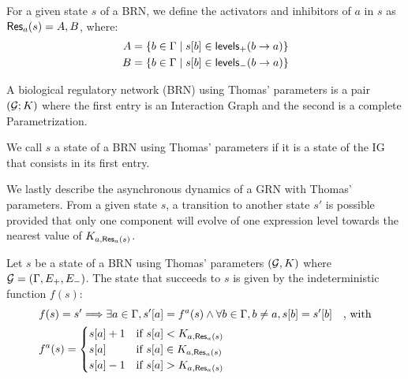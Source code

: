 \begin{definition}\label{def:resources}
For a given state $s$ of a BRN, we define the activators and inhibitors of $a$ in $s$ as $\mathsf{Res}_{a}(s) = A,B$, where:
\begin{align*}
  A &= \{b \in \Gamma \mid {s[b]} \in \mathsf{levels}_+(b\rightarrow a)\} \\
  B &= \{b \in \Gamma \mid {s[b]} \in \mathsf{levels}_-(b\rightarrow a)\}
\end{align*}
\end{definition}

\begin{definition}\label{def:brn}
A biological regulatory network (BRN) using Thomas' parameters is a pair $(\mathcal{G}; K)$ where the first entry is an Interaction Graph and the second is a complete Parametrization.
\end{definition}
We call $s$ a state of a BRN using Thomas' parameters if it is a state of the IG that consists in its first entry.


We lastly describe the asynchronous dynamics of a GRN with Thomas' parameters.
From a given state $s$, a transition to another state $s'$ is possible provided that only one component will evolve of one expression level towards the nearest value of $K_{a,\mathsf{Res}_{a}(s)}$.

\begin{definition}\label{def:dynamics}
Let $s$ be a state of a BRN using Thomas' parameters $(\mathcal{G}, K)$ where $\mathcal{G} = (\Gamma, E_+, E_-)$.
The state that succeeds to $s$ is given by the indeterministic function $f(s)$:
\begin{align*}
  & f(s) = s' \Longrightarrow \exists a \in \Gamma,
    {s'[a]} = f^a(s) \wedge
    \forall b \in \Gamma, b \neq a, {s[b]} = {s'[b]}
    \quad\text{, with}\\
  & f^a(s) =
  \begin{cases}
    {s[a]} + 1 & \text{if } {s[a]} < K_{a, \mathsf{Res}_{a}(s)} \\
    {s[a]} & \text{if } {s[a]} \in K_{a,\mathsf{Res}_{a}(s)}\\
    {s[a]} - 1 & \text{if } {s[a]} > K_{a,\mathsf{Res}_{a}(s)}
  \end{cases}
\end{align*}
\end{definition}

